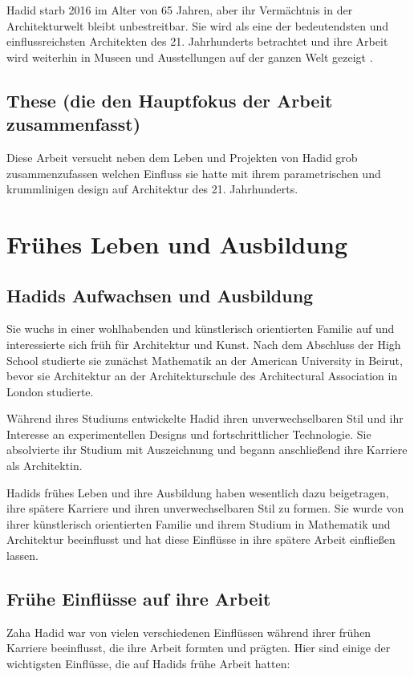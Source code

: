 \documentclass[a4paper]{article}
\begin{document}
Hadid starb 2016 im Alter von 65 Jahren, aber ihr Vermächtnis in der
Architekturwelt bleibt unbestreitbar. Sie wird als eine der bedeutendsten und
einflussreichsten Architekten des 21. Jahrhunderts betrachtet und ihre Arbeit
wird weiterhin in Museen und Ausstellungen auf der ganzen Welt gezeigt
\cite{hadid_britannica}.

\subsection{These (die den Hauptfokus der Arbeit zusammenfasst)}
Diese Arbeit versucht neben dem Leben und Projekten von Hadid grob
zusammenzufassen welchen Einfluss sie hatte mit ihrem parametrischen und
krummlinigen design auf Architektur des 21. Jahrhunderts.


\section{Frühes Leben und Ausbildung}
\subsection{Hadids Aufwachsen und Ausbildung}
Sie wuchs in einer wohlhabenden und künstlerisch orientierten Familie auf und
interessierte sich früh für Architektur und Kunst. Nach dem Abschluss der High
School studierte sie zunächst Mathematik an der American University in Beirut,
bevor sie Architektur an der Architekturschule des Architectural Association in
London studierte.

Während ihres Studiums entwickelte Hadid ihren unverwechselbaren Stil und ihr
Interesse an experimentellen Designs und fortschrittlicher Technologie. Sie
absolvierte ihr Studium mit Auszeichnung und begann anschließend ihre Karriere
als Architektin.

Hadids frühes Leben und ihre Ausbildung haben wesentlich dazu beigetragen, ihre
spätere Karriere und ihren unverwechselbaren Stil zu formen. Sie wurde von ihrer
künstlerisch orientierten Familie und ihrem Studium in Mathematik und
Architektur beeinflusst und hat diese Einflüsse in ihre spätere Arbeit
einfließen lassen.
\subsection{Frühe Einflüsse auf ihre Arbeit}
Zaha Hadid war von vielen verschiedenen Einflüssen während ihrer frühen Karriere
beeinflusst, die ihre Arbeit formten und prägten. Hier sind einige der
wichtigsten Einflüsse, die auf Hadids frühe Arbeit hatten:
\end{document}
